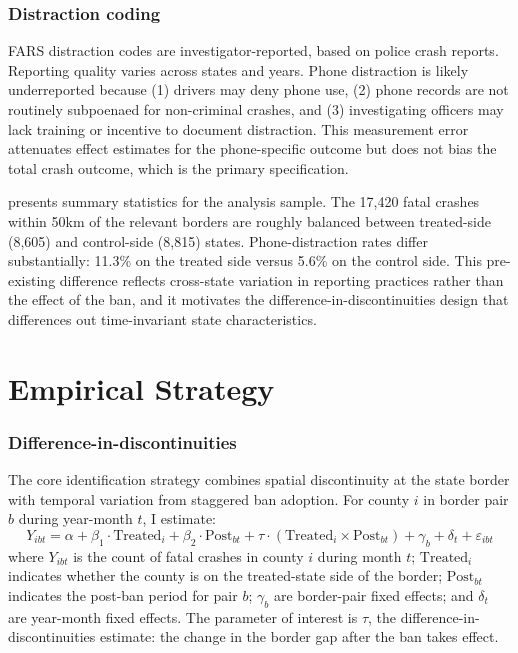 \documentclass[12pt]{article}
\begin{document}
\subsubsection*{Distraction coding} FARS distraction codes are investigator-reported, based on police crash reports. Reporting quality varies across states and years. Phone distraction is likely underreported because (1) drivers may deny phone use, (2) phone records are not routinely subpoenaed for non-criminal crashes, and (3) investigating officers may lack training or incentive to document distraction. This measurement error attenuates effect estimates for the phone-specific outcome but does not bias the total crash outcome, which is the primary specification.



 presents summary statistics for the analysis sample. The 17,420 fatal crashes within 50km of the relevant borders are roughly balanced between treated-side (8,605) and control-side (8,815) states. Phone-distraction rates differ substantially: 11.3\% on the treated side versus 5.6\% on the control side. This pre-existing difference reflects cross-state variation in reporting practices rather than the effect of the ban, and it motivates the difference-in-discontinuities design that differences out time-invariant state characteristics.


\section{Empirical Strategy}

\subsubsection*{Difference-in-discontinuities} The core identification strategy combines spatial discontinuity at the state border with temporal variation from staggered ban adoption. For county $i$ in border pair $b$ during year-month $t$, I estimate:
\begin{equation}
Y_{ibt} = \alpha + \beta_1 \cdot \text{Treated}_i + \beta_2 \cdot \text{Post}_{bt} + \tau \cdot (\text{Treated}_i \times \text{Post}_{bt}) + \gamma_b + \delta_t + \varepsilon_{ibt}
\label{eq:main}
\end{equation}
where $Y_{ibt}$ is the count of fatal crashes in county $i$ during month $t$; $\text{Treated}_i$ indicates whether the county is on the treated-state side of the border; $\text{Post}_{bt}$ indicates the post-ban period for pair $b$; $\gamma_b$ are border-pair fixed effects; and $\delta_t$ are year-month fixed effects. The parameter of interest is $\tau$, the difference-in-discontinuities estimate: the change in the border gap after the ban takes effect.
\end{document}

